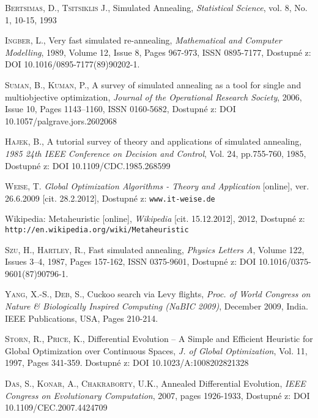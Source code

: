\begin{thebibliography}{99}
        \textsc{Bertsimas}, D., \textsc{Tsitsiklis} J., Simulated Annealing,
        \textit{Statistical Science}, vol. 8, No. 1, 10-15, 1993

        \textsc{Ingber}, L., Very fast simulated re-annealing, \textit{Mathematical and Computer Modelling}, 1989, Volume 12, Issue 8, Pages 967-973, ISSN 0895-7177, Dostupné z: DOI 10.1016/0895-7177(89)90202-1.

        \textsc{Suman}, B., \textsc{Kuman}, P., A survey of simulated annealing as a tool for single and multiobjective optimization, \textit{Journal of the Operational Research Society}, 2006, Issue 10, Pages 1143–1160, ISSN 0160-5682, Dostupné z: DOI 10.1057/palgrave.jors.2602068

        \textsc{Hajek}, B., A tutorial survey of theory and applications of simulated annealing, \textit{1985 24th IEEE Conference on Decision and Control}, Vol. 24, pp.755-760, 1985, Dostupné z: DOI 10.1109/CDC.1985.268599

        \textsc{Weise}, T. \textit{Global Optimization Algorithms - Theory and Application} [online], ver. 26.6.2009 [cit. 28.2.2012], Dostupné z: \texttt{www.it-weise.de}

        Wikipedia: Metaheuristic [online], \textit{Wikipedia} [cit. 15.12.2012], 2012, Dostupné z: \texttt{http://en.wikipedia.org/wiki/Metaheuristic}
        
        \textsc{Szu}, H., \textsc{Hartley}, R., Fast simulated annealing, \textit{Physics Letters A}, Volume 122, Issues 3–4, 1987, Pages 157-162, ISSN 0375-9601, Dostupné z: DOI 10.1016/0375-9601(87)90796-1.

        \textsc{Yang}, X.-S., \textsc{Deb}, S., Cuckoo search via Levy flights, \textit{Proc. of World Congress on Nature \& Biologically Inspired Computing (NaBIC 2009)}, December 2009, India. IEEE Publications, USA, Pages 210-214.

        \textsc{Storn}, R., \textsc{Price}, K., Differential Evolution – A Simple and Efficient Heuristic for Global Optimization over Continuous Spaces, \textit{J. of Global Optimization}, Vol. 11, 1997, Pages 341-359. Dostupné z: DOI 10.1023/A:1008202821328
        
        \textsc{Das}, S., \textsc{Konar}, A., \textsc{Chakraborty}, U.K., Annealed Differential Evolution, \textit{IEEE Congress on Evolutionary Computation}, 2007, pages 1926-1933, Dostupné z: DOI 10.1109/CEC.2007.4424709
        

\end{thebibliography}
